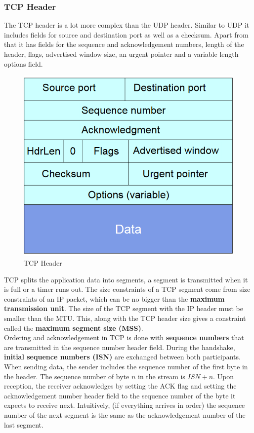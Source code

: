 \subsubsection{TCP Header}
The TCP header is a lot more complex than the UDP header. Similar to UDP it includes fields for source and destination port as well as a checksum. Apart from that it has fields for the sequence and acknowledgement numbers, length of the header, flags, advertised window size, an urgent pointer and a variable length options field.
\begin{figure}[H]
\centering
\includegraphics[width=.5\textwidth]{images/tcp_header.PNG}
\caption{TCP Header}
\label{tcp_header}
\end{figure}
TCP splits the application data into segments, a segment is transmitted when it is full or a timer runs out. The size constraints of a TCP segment come from size constraints of an IP packet, which can be no bigger than the \textbf{maximum transmission unit}. The size of the TCP segment with the IP header must be smaller than the MTU. This, along with the TCP header size gives a constraint called the \textbf{maximum segment size (MSS)}.\vspace{.3cm}\\

Ordering and acknowledgement in TCP is done with \textbf{sequence numbers} that are transmitted in the sequence number header field. During the handshake, \textbf{initial sequence numbers (ISN)} are exchanged between both participants. When sending data, the sender includes the sequence number of the first byte in the header. The sequence number of byte $n$ in the stream is $ISN + n$. Upon reception, the receiver acknowledges by setting the ACK flag and setting the acknowledgement number header field to the sequence number of the byte it expects to receive next. Intuitively, (if everything arrives in order) the sequence number of the next segment is the same as the acknowledgement number of the last segment.\vspace{.3cm}\\

